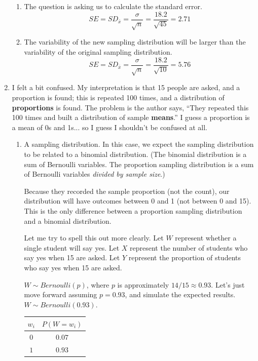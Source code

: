 \documentclass[12pt,letterpaper]{article}
\begin{document}
\begin{enumerate}
\begin{enumerate}
\item The question is asking us to calculate the standard error. 
$$SE = SD_{\bar{x}} = \frac{\sigma}{\sqrt{n}} = \frac{18.2}{\sqrt{45}} = 2.71 $$

\item The variability of the new sampling distribution will be larger than the variability of the original sampling distribution. 
$$SE = SD_{\bar{x}} = \frac{\sigma}{\sqrt{n}} = \frac{18.2}{\sqrt{10}} = 5.76 $$
\end{enumerate}

\newpage

\item I felt a bit confused. My interpretation is that 15 people are asked, and a proportion is found; this is repeated 100 times, and a distribution of {\bf proportions} is found. The problem is the author says, ``They repeated this 100 times and built a distribution of sample {\bf means}.'' I guess a proportion is a mean of 0s and 1s... so I guess I shouldn't be confused at all.


\begin{enumerate}
\item A sampling distribution. In this case, we expect the sampling distribution to be related to a binomial distribution. (The binomial distribution is a sum of Bernoulli variables. The proportion sampling distribution is a sum of Bernoulli variables \emph{divided by sample size}.) 

Because they recorded the sample proportion (not the count), our distribution will have outcomes between 0 and 1  (not between 0 and 15). This is the only difference between a proportion sampling distribution and a binomial distribution.

Let me try to spell this out more clearly. Let $W$ represent whether a single student will say yes. Let $X$ represent the number of students who say yes when 15 are asked. Let $Y$ represent the proportion of students who say yes when 15 are asked.

$W\sim Bernoulli(p)$, where $p$ is approximately $14/15 \approx 0.93$. Let's just move forward assuming $p=0.93$, and simulate the expected results. $W\sim Bernoulli(0.93)$.

\begin{center}
\begin{tabular}{|c|c|}\hline
$w_i$ & $P(W=w_i)$ \\ \hline
$0$   &  $0.07$\\
$1$   &  $0.93$ \\\hline
\end{tabular}
\end{center}


\end{enumerate}
\end{enumerate}
\end{document}
